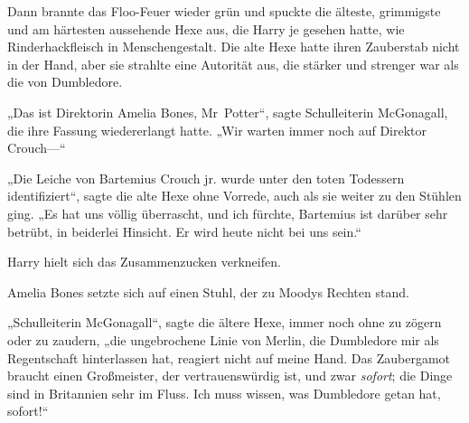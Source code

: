 Dann brannte das Floo-Feuer wieder grün und spuckte die älteste, grimmigste und am härtesten aussehende Hexe aus, die Harry je gesehen hatte, wie Rinderhackfleisch in Menschengestalt. Die alte Hexe hatte ihren Zauberstab nicht in der Hand, aber sie strahlte eine Autorität aus, die stärker und strenger war als die von Dumbledore.

„Das ist Direktorin Amelia Bones, Mr~Potter“, sagte Schulleiterin McGonagall, die ihre Fassung wiedererlangt hatte. „Wir warten immer noch auf Direktor Crouch—“

„Die Leiche von Bartemius Crouch jr. wurde unter den toten Todessern identifiziert“, sagte die alte Hexe ohne Vorrede, auch als sie weiter zu den Stühlen ging.
„Es hat uns völlig überrascht, und ich fürchte, Bartemius ist darüber sehr betrübt, in beiderlei Hinsicht. Er wird heute nicht bei uns sein.“

Harry hielt sich das Zusammenzucken verkneifen.

Amelia Bones setzte sich auf einen Stuhl, der zu Moodys Rechten stand.

„Schulleiterin McGonagall“, sagte die ältere Hexe, immer noch ohne zu zögern oder zu zaudern, „die ungebrochene Linie von Merlin, die Dumbledore mir als Regentschaft hinterlassen hat, reagiert nicht auf meine Hand. Das Zaubergamot braucht einen Großmeister, der vertrauenswürdig ist, und zwar \emph{sofort}; die Dinge sind in Britannien sehr im Fluss. Ich muss wissen, was Dumbledore getan hat, sofort!“

